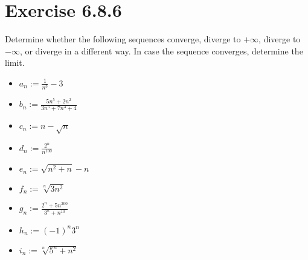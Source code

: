 \documentclass{article}
\theoremstyle{mytheoremstyle}
\theoremstyle{mytheoremstyle}
\theoremstyle{myproblemstyle}
\begin{document}
    \section{Exercise 6.8.6}
    \begin{problem}
        Determine whether the following sequences converge, diverge to $+\infty$, diverge to $-\infty$, or diverge in a different way.
        In case the sequence converges, determine the limit.
        \begin{itemize}
            \item $a_n := \frac{1}{n^3} - 3$
            \item $b_n := \frac{5n^5 + 2n^2}{3n^5+7n^3+4}$
            \item $c_n := n - \sqrt{n}$
            \item $d_n := \frac{2^n}{n^100}$
            \item $e_n := \sqrt{n^2+n}-n$
            \item $f_n := \sqrt[n]{3n^2}$
            \item $g_n := \frac{2^n + 5n^200}{3^n+n^10}$
            \item $h_n := (-1)^n3^n$
            \item $i_n := \sqrt[n]{5^n + n^2}$
        \end{itemize}
    \end{problem}
\end{document}
